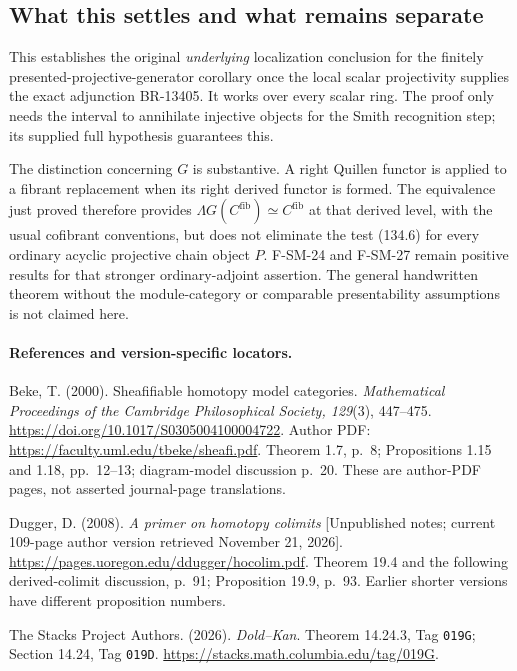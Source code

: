 \documentclass[11pt,a4paper]{article}
\theoremstyle{definition}\newtheorem{definition}[theorem]{Definition}
\theoremstyle{remark}\newtheorem{remark}[theorem]{Remark}
\begin{document}
\subsection{What this settles and what remains separate}
This establishes the original \emph{underlying} localization
conclusion for the finitely presented-projective-generator
corollary once the local scalar projectivity supplies the
exact adjunction BR-13405.  It works over every scalar ring.
The proof only needs the interval to annihilate injective
objects for the Smith recognition step; its supplied full
hypothesis guarantees this.

The distinction concerning \(G\) is substantive.
A right Quillen functor is applied to a fibrant replacement
when its right derived functor is formed.
The equivalence just proved therefore provides
\(\Lambda G(C^{\mathrm{fib}})\simeq C^{\mathrm{fib}}\)
at that derived level, with the usual cofibrant conventions,
but does not eliminate the test (134.6) for every ordinary
acyclic projective chain object \(P\).
F-SM-24 and F-SM-27 remain positive results for that stronger
ordinary-adjoint assertion.
The general handwritten theorem without the module-category
or comparable presentability assumptions is not claimed here.

\paragraph{References and version-specific locators.}
Beke, T. (2000). Sheafifiable homotopy model categories.
\emph{Mathematical Proceedings of the Cambridge Philosophical
Society, 129}(3), 447--475.
\url{https://doi.org/10.1017/S0305004100004722}.
Author PDF:
\url{https://faculty.uml.edu/tbeke/sheafi.pdf}.
Theorem 1.7, p.~8; Propositions 1.15 and 1.18, pp.~12--13;
diagram-model discussion p.~20.  These are author-PDF pages,
not asserted journal-page translations.

Dugger, D. (2008). \emph{A primer on homotopy colimits}
[Unpublished notes; current 109-page author version retrieved
November 21, 2026].
\url{https://pages.uoregon.edu/ddugger/hocolim.pdf}.
Theorem 19.4 and the following derived-colimit discussion,
p.~91; Proposition 19.9, p.~93.
Earlier shorter versions have different proposition numbers.

The Stacks Project Authors. (2026). \emph{Dold--Kan}.
Theorem 14.24.3, Tag \nolinkurl{019G}; Section 14.24, Tag
\nolinkurl{019D}.
\url{https://stacks.math.columbia.edu/tag/019G}.


\end{document}

